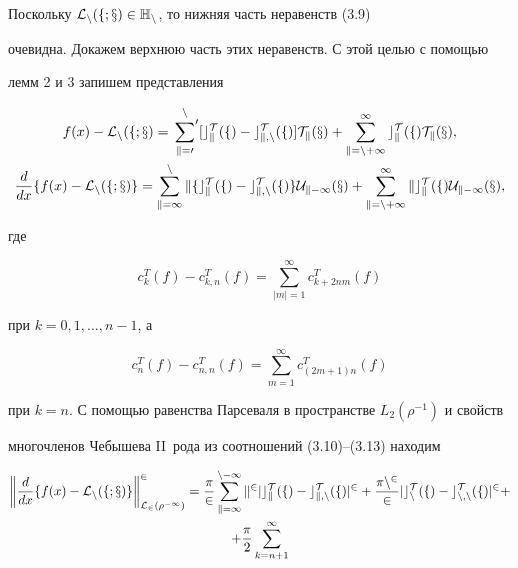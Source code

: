 \begin{pf}


Поскольку $\cal{L}_n(f;x)\in \Bbb{H}_n$, то нижняя часть неравенств (3.9)


очевидна. Докажем верхнюю часть этих неравенств. С этой целью с помощью


лемм 2 и 3 запишем представления


\begin{gather}


f(x)-\cal{L}_n(f;x)=\sideset{}{'}\sum_{k=0}^n [c_k^T(f)-c_{k,n}^T(f)]T_k(x)+


\sum_{k=n+1}^\infty c_k^T(f)T_k(x), \\


%


\frac{d}{dx}\{f(x)-\cal{L}_n(f;x)\}=\sum_{k=1}^nk\{


c_k^T(f)-c_{k,n}^T(f)\}U_{k-1}(x)+


\sum_{k=n+1}^\infty k c_k^T(f)U_{k-1}(x),


\end{gather}


где


\begin{equation}


c_k^T(f)-c_{k,n}^T(f)=\sum_{|m|=1}^\infty c_{k+2nm}^T(f)


\end{equation}


при $k=0,1,\dotsc,n-1$, а 


\begin{equation}


c_n^T(f)-c_{n,n}^T(f)=\sum_{m=1}^\infty c_{(2m+1)n}^T(f)


\end{equation}


при $k=n$. С помощью равенства Парсеваля в пространстве $L_2(\rho^{-1})$ и свойств 


многочленов Чебышева II~рода из соотношений (3.10)--(3.13) находим


\begin{gather}


\bigg\|\frac{d}{dx}\{f(x)-\cal{L}_n(f;x)\}\bigg\|_{L_2(\rho^{-1})}^2=


\frac{\pi}{2}\sum_{k=1}^{n-1}k^2|c_k^T(f)-c_{k,n}^T(f)|^2+


\frac{\pi n^2}{2}|c_n^T(f)-c_{n,n}^T(f)|^2+\notag \\


%


+\frac{\pi}{2}\sum_{k=n+1}^\infty



\end{gather}
\end{pf}
